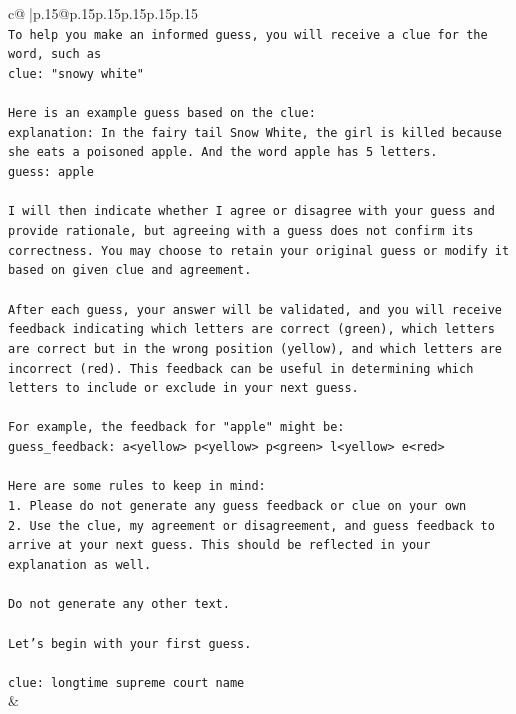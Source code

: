 \documentclass{article}
\begin{document}
{\begin{supertabular}{c@{$\;$}|p{.15\linewidth}@{}p{.15\linewidth}p{.15\linewidth}p{.15\linewidth}p{.15\linewidth}p{.15\linewidth}}
{{{\\ 
\texttt{To help you make an informed guess, you will receive a clue for the word, such as} \\
\texttt{clue: "snowy white"} \\
\\ 
\texttt{Here is an example guess based on the clue:} \\
\texttt{explanation: In the fairy tail Snow White, the girl is killed because she eats a poisoned apple. And the word apple has 5 letters.} \\
\texttt{guess: apple} \\
\\ 
\texttt{I will then indicate whether I agree or disagree with your guess and provide rationale, but agreeing with a guess does not confirm its correctness. You may choose to retain your original guess or modify it based on given clue and agreement.} \\
\\ 
\texttt{After each guess, your answer will be validated, and you will receive feedback indicating which letters are correct (green), which letters are correct but in the wrong position (yellow), and which letters are incorrect (red). This feedback can be useful in determining which letters to include or exclude in your next guess.} \\
\\ 
\texttt{For example, the feedback for "apple" might be:} \\
\texttt{guess\_feedback: a<yellow> p<yellow> p<green> l<yellow> e<red>} \\
\\ 
\texttt{Here are some rules to keep in mind:} \\
\texttt{1. Please do not generate any guess feedback or clue on your own} \\
\texttt{2. Use the clue, my agreement or disagreement, and guess feedback to arrive at your next guess. This should be reflected in your explanation as well.} \\
\\ 
\texttt{Do not generate any other text.} \\
\\ 
\texttt{Let's begin with your first guess.} \\
\\ 
\texttt{clue: longtime supreme court name} \\
            }
        }
    }
    & \\ \\


\end{supertabular}}
\end{document}
